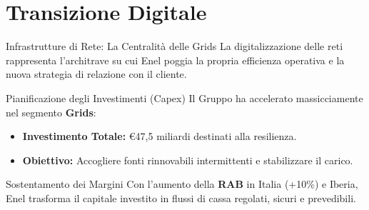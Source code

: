 
\section{Transizione Digitale}

\begin{frame}{Infrastrutture di Rete: La Centralità delle Grids}
    La digitalizzazione delle reti rappresenta l'architrave su cui Enel poggia la propria efficienza operativa e la nuova strategia di relazione con il cliente.
    \vspace{0.2cm}
    

    \begin{block}{Pianificazione degli Investimenti (Capex)}
        Il Gruppo ha accelerato massicciamente nel segmento \textbf{Grids}:
        \begin{itemize}
            \item \textbf{Investimento Totale:} €47,5 miliardi destinati alla resilienza.
            \item \textbf{Obiettivo:} Accogliere fonti rinnovabili intermittenti e stabilizzare il carico.
        \end{itemize}
    \end{block}
    \vspace{0.1cm}
    \pause

    \begin{block}{Sostentamento dei Margini}
        Con l'aumento della \textbf{RAB} in Italia (+10\%) e Iberia, Enel trasforma il capitale investito in flussi di cassa regolati, sicuri e prevedibili.
    \end{block}
\end{frame}


